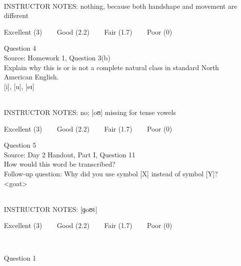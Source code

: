 \documentclass[12pt]{article}
\begin{document}
~\\
INSTRUCTOR NOTES: nothing, because both handshape and movement are different


\vfill
Excellent (3) ~~~ Good (2.2) ~~~ Fair (1.7) ~~~ Poor (0)
\newpage

{\large Question 4}\\

Source: Homework 1, Question 3(b)\\

Explain why this is or is not a complete natural class in standard North American English.\\

{[i]}, {[u]}, {[eɪ]}


~\\
INSTRUCTOR NOTES: no; [oʊ] missing for tense vowels


\vfill
Excellent (3) ~~~ Good (2.2) ~~~ Fair (1.7) ~~~ Poor (0)
\newpage

{\large Question 5}\\

Source: Day 2 Handout, Part I, Question 11\\

How would this word be transcribed?\\ Follow-up question: Why did you use symbol [X] instead of symbol [Y]?\\

<goat>


~\\
INSTRUCTOR NOTES: [ɡoʊt]


\vfill
Excellent (3) ~~~ Good (2.2) ~~~ Fair (1.7) ~~~ Poor (0)
\newpage

\begin{center}
\textbf{{\color{red}{\HUGE END OF EXAM}}}\\

\end{center}
\newpage

\begin{center}
\textbf{{\color{blue}{\HUGE START OF EXAM\\}}}

\textbf{{\color{blue}{\HUGE Student ID: 9303\\}}}

\textbf{{\color{blue}{\HUGE 11:45 AM - 12:00 noon\\}}}

\end{center}
\newpage

{\large Question 1}\\
\end{document}

